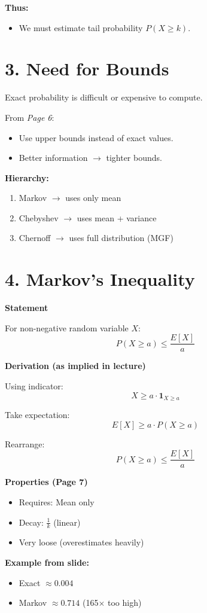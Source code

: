\documentclass{article}
\begin{document}
\textbf{Thus:}
\begin{itemize}
    \item We must estimate tail probability $P(X \ge k)$.
\end{itemize}

\section*{3. Need for Bounds}

Exact probability is difficult or expensive to compute.

From \textit{Page 6}:
\begin{itemize}
    \item Use upper bounds instead of exact values.
    \item Better information $\rightarrow$ tighter bounds.
\end{itemize}

\textbf{Hierarchy:}
\begin{enumerate}
    \item Markov $\rightarrow$ uses only mean
    \item Chebyshev $\rightarrow$ uses mean + variance
    \item Chernoff $\rightarrow$ uses full distribution (MGF)
\end{enumerate}

\section*{4. Markov's Inequality}

\textbf{Statement}

For non-negative random variable $X$:
\[P(X \ge a) \le \frac{E[X]}{a}\]

\textbf{Derivation (as implied in lecture)}

Using indicator:
\[X \ge a \cdot \mathbf{1}_{X \ge a}\]

Take expectation:
\[E[X] \ge a \cdot P(X \ge a)\]

Rearrange:
\[P(X \ge a) \le \frac{E[X]}{a}\]

\textbf{Properties (Page 7)}
\begin{itemize}
    \item Requires: Mean only
    \item Decay: $\frac{1}{k}$ (linear)
    \item Very loose (overestimates heavily)
\end{itemize}

\textbf{Example from slide:}
\begin{itemize}
    \item Exact $\approx 0.004$
    \item Markov $\approx 0.714$ (165$\times$ too high)
\end{itemize}
\end{document}

